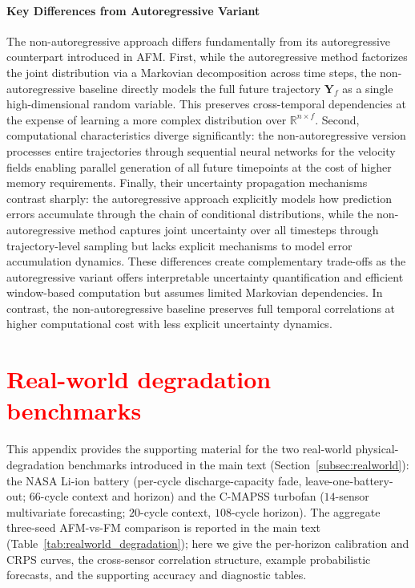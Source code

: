 \documentclass[a4paper,10pt,twocolumn,preprint,3p]{elsarticle}
\begin{document}
\paragraph{Key Differences from Autoregressive Variant} The non-autoregressive approach differs fundamentally from its autoregressive counterpart introduced in AFM. First, while the autoregressive method factorizes the joint distribution via a Markovian decomposition across time steps, the non-autoregressive baseline directly models the full future trajectory $\mathbf{Y}_f$
as a single high-dimensional random variable. This preserves cross-temporal dependencies at the expense of learning a more complex distribution over $\mathbb{R}^{n \times f}$. 
Second, computational characteristics diverge significantly: the non-autoregressive version processes entire trajectories through sequential neural networks for the velocity fields enabling parallel generation of all future timepoints at the cost of higher memory requirements. Finally, their uncertainty propagation mechanisms contrast sharply: the autoregressive approach explicitly models how prediction errors accumulate through the chain of conditional distributions, while the non-autoregressive method captures joint uncertainty over all timesteps through trajectory-level sampling but lacks explicit mechanisms to model error accumulation dynamics. These differences create complementary trade-offs as the autoregressive variant offers interpretable uncertainty quantification and efficient window-based computation but assumes limited Markovian dependencies. In contrast, the non-autoregressive baseline preserves full temporal correlations at higher computational cost with less explicit uncertainty dynamics.







\section{\textcolor{red}{Real-world degradation benchmarks}}\label{app:degradation}

{\color{red}
This appendix provides the supporting material for the two real-world physical-degradation benchmarks introduced in the main text (Section~\ref{subsec:realworld}): the NASA Li-ion battery (per-cycle discharge-capacity fade, leave-one-battery-out; $66$-cycle context and horizon) and the C-MAPSS turbofan ($14$-sensor multivariate forecasting; $20$-cycle context, $108$-cycle horizon). The aggregate three-seed AFM-vs-FM comparison is reported in the main text (Table~\ref{tab:realworld_degradation}); here we give the per-horizon calibration and CRPS curves, the cross-sensor correlation structure, example probabilistic forecasts, and the supporting accuracy and diagnostic tables.
}
\end{document}

